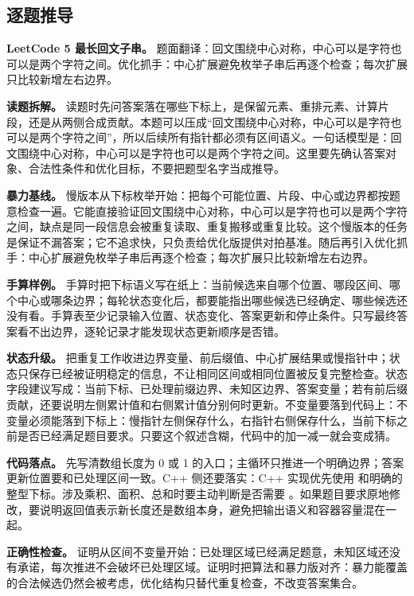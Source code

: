 \subsection{逐题推导}

\noindent\textbf{LeetCode 5 最长回文子串。} 题面翻译：回文围绕中心对称，中心可以是字符也可以是两个字符之间。优化抓手：中心扩展避免枚举子串后再逐个检查；每次扩展只比较新增左右边界。

\textbf{读题拆解。} 读题时先问答案落在哪些下标上，是保留元素、重排元素、计算片段，还是从两侧合成贡献。本题可以压成“回文围绕中心对称，中心可以是字符也可以是两个字符之间”，所以后续所有指针都必须有区间语义。一句话模型是：回文围绕中心对称，中心可以是字符也可以是两个字符之间。这里要先确认答案对象、合法性条件和优化目标，不要把题型名字当成推导。

\textbf{暴力基线。} 慢版本从下标枚举开始：把每个可能位置、片段、中心或边界都按题意检查一遍。它能直接验证回文围绕中心对称，中心可以是字符也可以是两个字符之间，缺点是同一段信息会被重复读取、重复搬移或重复比较。这个慢版本的任务是保证不漏答案；它不追求快，只负责给优化版提供对拍基准。随后再引入优化抓手：中心扩展避免枚举子串后再逐个检查；每次扩展只比较新增左右边界。

\textbf{手算样例。} 手算时把下标语义写在纸上：当前候选来自哪个位置、哪段区间、哪个中心或哪条边界；每轮状态变化后，都要能指出哪些候选已经确定、哪些候选还没有看。手算表至少记录输入位置、状态变化、答案更新和停止条件。只写最终答案看不出边界，逐轮记录才能发现状态更新顺序是否错。

\textbf{状态升级。} 把重复工作收进边界变量、前后缀值、中心扩展结果或慢指针中；状态只保存已经被证明稳定的信息，不让相同区间或相同位置被反复完整检查。状态字段建议写成：当前下标、已处理前缀边界、未知区边界、答案变量；若有前后缀贡献，还要说明左侧累计值和右侧累计值分别何时更新。不变量要落到代码上：不变量必须能落到下标上：慢指针左侧保存什么，右指针右侧保存什么，当前下标之前是否已经满足题目要求。只要这个叙述含糊，代码中的加一减一就会变成猜。

\textbf{代码落点。} 先写清数组长度为 0 或 1 的入口；主循环只推进一个明确边界；答案更新位置要和已处理区间一致。C++ 侧还要落实：C++ 实现优先使用  和明确的整型下标。涉及乘积、面积、总和时要主动判断是否需要 。如果题目要求原地修改，要说明返回值表示新长度还是数组本身，避免把输出语义和容器容量混在一起。

\textbf{正确性检查。} 证明从区间不变量开始：已处理区域已经满足题意，未知区域还没有承诺，每次推进不会破坏已处理区域。证明时把算法和暴力版对齐：暴力能覆盖的合法候选仍然会被考虑，优化结构只替代重复检查，不改变答案集合。

